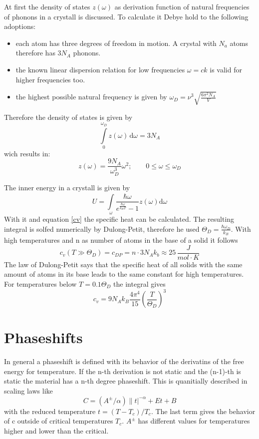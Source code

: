 \documentclass{include/thesisclass3}
\newcommand{\dd}{\text{d}}
\newcommand{\e}[1]{\,\si{#1}}
\begin{document}
At first the density of states $z(\omega)$ as derivation function of natural frequencies of phonons in a crystall is discussed.
To calculate it Debye hold to the following adoptions:
\begin{itemize}
\item each atom has three degrees of freedom in motion. A crystal with $N_a$ atoms therefore has $3N_A$ phonons.\\
\item the known linear dispersion relation for low frequencies $\omega=ck$ is valid for higher frequencies too.\\
\item the highest possible natural frequency is given by $\omega_D=\nu^3\sqrt{\frac{6 \pi ^2 N_A}{V}}$
\end{itemize}
Therefore the density of states is given by
\begin{equation}
\int \limits_{0}^{\omega_D} \! z(\omega) \, \dd\omega = 3N_A
\end{equation}
wich results in:
\begin{equation}
z(\omega)= \frac{9N_A}{\omega_D^3}\omega^2;\qquad 0\leq  \omega \leq \omega_D
\end{equation}

The inner energy in a crystall is given by
\begin{equation}
U= \int \limits_{\omega}^{}\! \frac{\hbar \omega}{e^{\frac{\hbar \omega}{k_B T}}-1} z(\omega)\dd \omega
\end{equation}
With it and equation \ref{cv} the specific heat can be calculated. The resulting integral is solfed numerically by Dulong-Petit, therefore he used $\Theta_D=\frac{\hbar \omega_D}{k_B}$. With high temperatures and n as number of atoms in the base of a solid it follows
\begin{equation}
c_v(T\gg\Theta_D)=c_{DP}=n\cdot 3N_Ak_b\approx 25\e{\frac{J}{mol\cdot K}}
\end{equation}
The law of Dulong-Petit says that the specific heat of all solids with the same amount of atoms in its base leads to the same constant for high temperatures. For temperatures below  $T=0.1\Theta_D$ the integral gives
\begin{equation}
c_v=9N_Ak_B\frac{4\pi^4}{15}\left(\frac{T}{\Theta_D} \right)^3
\end{equation}

\section{Phaseshifts}
In general a phaseshift is defined with its behavior of the derivatins of the free energy for temperature. 
If the n-th derivation is not static and the (n-1)-th is static the material has a n-th degree phaseshift. 
This is quanitially described in scaling laws like\begin{equation}
C=(A^{\pm}/\alpha)\|t|^{-\alpha}+Et+B
\end{equation}
with the reduced temperature $t=(T-T_c)/T_c$. The last term gives the behavior of c outside of critical temperatures $T_c$. $A^{\pm}$ has different values for temperatures higher and lower than the critical. 
\end{document}

